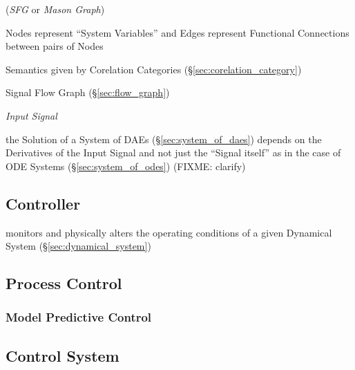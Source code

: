 (\emph{SFG} or \emph{Mason Graph})

Nodes represent ``System Variables'' and Edges represent Functional
Connections between pairs of Nodes


Semantics given by Corelation Categories
(\S\ref{sec:corelation_category})

Signal Flow Graph (\S\ref{sec:flow_graph})

\emph{Input Signal}

\fist the Solution of a System of DAEs (\S\ref{sec:system_of_daes}) depends on
the Derivatives of the Input Signal and not just the ``Signal itself'' as in
the case of ODE Systems (\S\ref{sec:system_of_odes})
(FIXME: clarify)



\subsection{Controller}\label{sec:controller}


monitors and physically alters the operating conditions of a given
Dynamical System (\S\ref{sec:dynamical_system})



\subsection{Process Control}\label{sec:process_control}

\subsubsection{Model Predictive Control}\label{sec:model_predictive_control}



\subsection{Control System}\label{sec:control_system}

